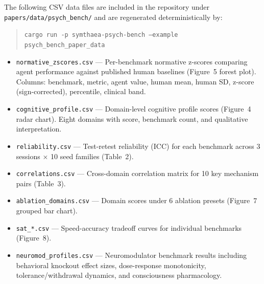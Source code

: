 \documentclass[10pt,landscape]{article}
\begin{document}
The following CSV data files are included in the repository under \texttt{papers/data/psych\_bench/} and are regenerated deterministically by:

\begin{quote}
\texttt{cargo run -p symthaea-psych-bench --example psych\_bench\_paper\_data}
\end{quote}

\begin{itemize}
\item \texttt{normative\_zscores.csv} --- Per-benchmark normative z-scores comparing agent performance against published human baselines (Figure~5 forest plot). Columns: benchmark, metric, agent value, human mean, human SD, z-score (sign-corrected), percentile, clinical band.
\item \texttt{cognitive\_profile.csv} --- Domain-level cognitive profile scores (Figure~4 radar chart). Eight domains with score, benchmark count, and qualitative interpretation.
\item \texttt{reliability.csv} --- Test-retest reliability (ICC) for each benchmark across 3 sessions $\times$ 10 seed families (Table~2).
\item \texttt{correlations.csv} --- Cross-domain correlation matrix for 10 key mechanism pairs (Table~3).
\item \texttt{ablation\_domains.csv} --- Domain scores under 6 ablation presets (Figure~7 grouped bar chart).
\item \texttt{sat\_*.csv} --- Speed-accuracy tradeoff curves for individual benchmarks (Figure~8).
\item \texttt{neuromod\_profiles.csv} --- Neuromodulator benchmark results including behavioral knockout effect sizes, dose-response monotonicity, tolerance/withdrawal dynamics, and consciousness pharmacology.
\end{itemize}



\end{document}
